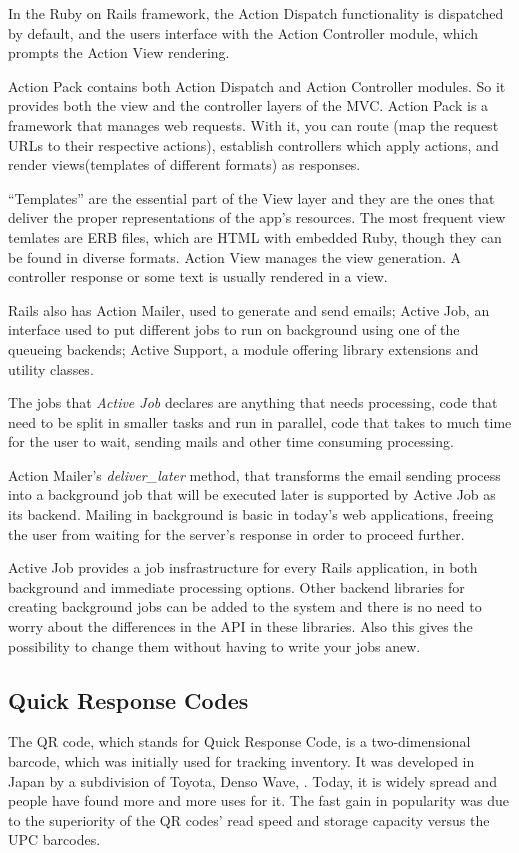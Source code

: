 In the Ruby on Rails framework, the Action Dispatch functionality is dispatched by default, and the users interface with the Action Controller module, which prompts the Action View rendering. 

Action Pack contains both Action Dispatch and Action Controller modules. So it provides both the view and the controller layers of the MVC. Action Pack is a framework that manages web requests. With it, you can route (map the request URLs to their respective actions), establish controllers which apply actions, and render views(templates of different formats) as responses.

``Templates'' are the essential part of the View layer and they are the ones that deliver the  proper representations of the app's resources. The most frequent view temlates are ERB files, which are HTML with embedded Ruby, though they can be found in diverse formats. Action View manages the view generation. A controller response or some text is usually rendered in a view.
 
Rails also has Action Mailer, used to generate and send emails; Active Job, an interface used to put different jobs to run on background using one of the queueing backends; Active Support, a module offering library extensions and utility classes.

The jobs that \textit{Active Job} declares are anything that needs processing, code that need to be split in smaller tasks and run in parallel, code that takes to much time for the user to wait, sending mails and other time consuming processing. 

Action Mailer's \textit{deliver\_later} method, that transforms the email sending process into a background job that will be executed later is supported by Active Job as its backend. Mailing in background is basic in today's web applications, freeing the user from waiting for the server's response in order to proceed further.
  
Active Job provides a job insfrastructure for every Rails application, in both background and immediate processing options. Other backend libraries for creating background jobs can be added to the system and there is no need to worry about the differences in the API in these libraries. Also this gives the possibility to change them without having to write your jobs anew.




\subsection{Quick Response Codes}
The QR code, which stands for Quick Response Code, is a two-dimensional barcode, which was initially used for tracking inventory. It was developed in Japan by a subdivision of Toyota, Denso Wave, \cite{qr_codes}. Today, it is widely spread and people have found more and more uses for it. The fast gain in popularity was due to the superiority of the QR codes’ read speed and storage capacity versus the UPC barcodes.

